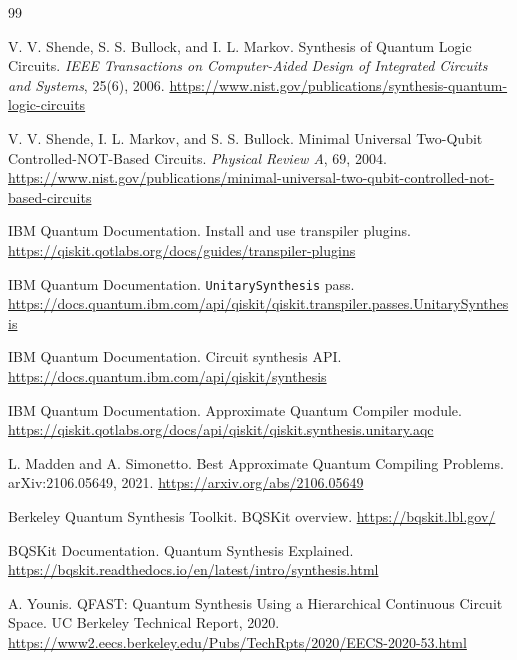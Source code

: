 \documentclass[11pt,a4paper]{article}
\begin{document}
\begin{thebibliography}{99}

V. V. Shende, S. S. Bullock, and I. L. Markov.
\newblock Synthesis of Quantum Logic Circuits.
\newblock \emph{IEEE Transactions on Computer-Aided Design of Integrated
Circuits and Systems}, 25(6), 2006.
\newblock \url{https://www.nist.gov/publications/synthesis-quantum-logic-circuits}

V. V. Shende, I. L. Markov, and S. S. Bullock.
\newblock Minimal Universal Two-Qubit Controlled-NOT-Based Circuits.
\newblock \emph{Physical Review A}, 69, 2004.
\newblock \url{https://www.nist.gov/publications/minimal-universal-two-qubit-controlled-not-based-circuits}

IBM Quantum Documentation.
\newblock Install and use transpiler plugins.
\newblock \url{https://qiskit.qotlabs.org/docs/guides/transpiler-plugins}

IBM Quantum Documentation.
\newblock \texttt{UnitarySynthesis} pass.
\newblock \url{https://docs.quantum.ibm.com/api/qiskit/qiskit.transpiler.passes.UnitarySynthesis}

IBM Quantum Documentation.
\newblock Circuit synthesis API.
\newblock \url{https://docs.quantum.ibm.com/api/qiskit/synthesis}

IBM Quantum Documentation.
\newblock Approximate Quantum Compiler module.
\newblock \url{https://qiskit.qotlabs.org/docs/api/qiskit/qiskit.synthesis.unitary.aqc}

L. Madden and A. Simonetto.
\newblock Best Approximate Quantum Compiling Problems.
\newblock arXiv:2106.05649, 2021.
\newblock \url{https://arxiv.org/abs/2106.05649}

Berkeley Quantum Synthesis Toolkit.
\newblock BQSKit overview.
\newblock \url{https://bqskit.lbl.gov/}

BQSKit Documentation.
\newblock Quantum Synthesis Explained.
\newblock \url{https://bqskit.readthedocs.io/en/latest/intro/synthesis.html}

A. Younis.
\newblock QFAST: Quantum Synthesis Using a Hierarchical Continuous Circuit Space.
\newblock UC Berkeley Technical Report, 2020.
\newblock \url{https://www2.eecs.berkeley.edu/Pubs/TechRpts/2020/EECS-2020-53.html}


\end{thebibliography}
\end{document}

